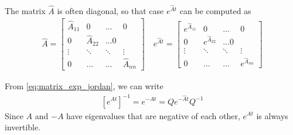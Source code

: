 The matrix $\hat{A}$ is often diagonal, so that case $e^{\hat{A}t}$ can be computed as
%
\begin{align}
	\hat{A} = \begin{bmatrix}
	\hat{A}_{11} & 0 & \ldots & 0 \\
		0 & \hat{A}_{22} & \ldots 0 \\
		\vdots & \ddots & \ddots & \vdots \\
		0 & \ldots & \ldots & \hat{A}_{nn} 
	\end{bmatrix} \quad 
	e^{\hat{A}t} = \begin{bmatrix}
	e^{\hat{A}_{11}} & 0 & \ldots & 0 \\
	0 & e^{\hat{A}_{22}} & \ldots 0 \\
	\vdots & \ddots & \ddots & \vdots \\
	0 & \ldots & \ldots & e^{\hat{A}_{nn}}
	\end{bmatrix}
\end{align}

From \eqref{eq:matrix_exp_jordan}, we can write 
%
\begin{align}
	\left[e^{At}\right]^{-1} = e^{-At} = Q e ^{-\hat{A}t} Q^{-1}
\end{align}
%
Since $A$ and $-A$ have eigenvalues that are negative of each other, $e^{At}$ is always invertible.

